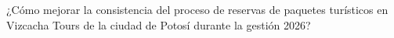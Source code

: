 \label{cap:problema-cientifico}

¿Cómo mejorar la consistencia del proceso de reservas de paquetes turísticos
en Vizcacha Tours de la ciudad de Potosí durante la gestión 2026?

